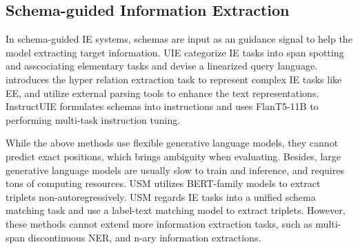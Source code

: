 \subsection{Schema-guided Information Extraction}

In schema-guided IE systems, schemas are input as an guidance signal to help the model extracting target information.
UIE \cite{uie} categorize IE tasks into span spotting and asscociating elementary tasks and devise a linearized query language.
\citet{lasuie} introduces the hyper relation extraction task to represent complex IE tasks like EE, and utilize external parsing tools to enhance the text representations.
InstructUIE \cite{instructuie} formulates schemas into instructions and uses FlanT5-11B \cite{flan-t5} to performing multi-task instruction tuning.

While the above methods use flexible generative language models, they cannot predict exact positions, which brings ambiguity when evaluating.
Besides, large generative language models are usually slow to train and inference, and requires tons of computing resources.
USM \cite{usm} utilizes BERT-family models to extract triplets non-autoregressively.
USM regards IE tasks into a unified schema matching task and use a label-text matching model to extract triplets.
However, these methods cannot extend more information extraction tasks, such as multi-span discontinuous NER, and n-ary information extractions.
